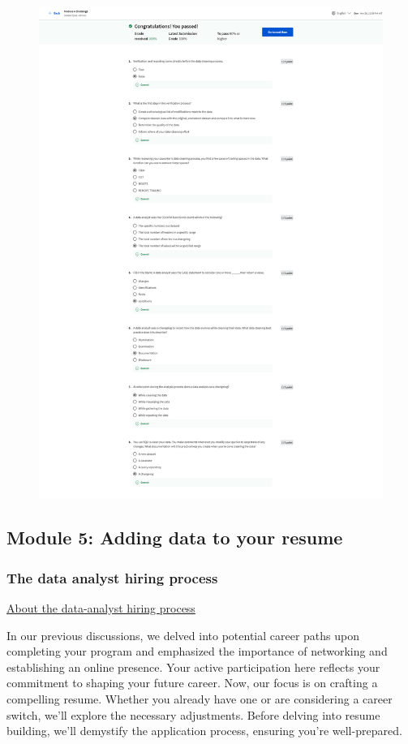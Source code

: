 \documentclass[]{article}
\begin{document}
\begin{figure}
  \centering
  \includegraphics[height=\textheight,keepaspectratio]{image/module_4.png}
\end{figure}

\pagebreak

\subsection{Module 5: Adding data to your resume}

\subsubsection{The data analyst hiring process}

\uline{About the data-analyst hiring process}

In our previous discussions, we delved into potential career paths upon completing your program and emphasized the importance of networking and establishing an online presence. Your active participation here reflects your commitment to shaping your future career. Now, our focus is on crafting a compelling resume. Whether you already have one or are considering a career switch, we'll explore the necessary adjustments. Before delving into resume building, we'll demystify the application process, ensuring you're well-prepared.
\end{document}
